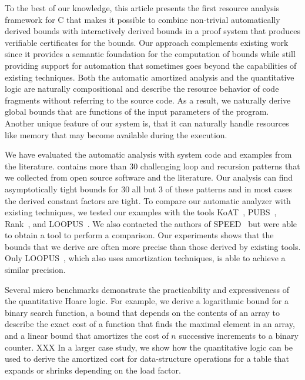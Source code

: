 \documentclass[nocopyrightspace,preprint]{sigplanconf}
\newcommand{\pref}[1]{\prettyref{#1}}
\begin{document}
To the best of our knowledge, this article presents the first resource
analysis framework for C that makes it possible to combine non-trivial
automatically derived bounds with interactively derived bounds in a
proof system that produces verifiable certificates for the bounds.
Our approach complements existing work since it provides a semantic
foundation for the computation of bounds while still providing support
for automation that sometimes goes beyond the capabilities of existing
techniques.  Both the automatic amortized analysis and the
quantitative logic are naturally compositional and describe the
resource behavior of code fragments without referring to the source
code.  As a result, we naturally derive global bounds that are
functions of the input parameters of the program.  Another unique
feature of our system is, that it can naturally handle resources like
memory that may become available during the execution.

We have evaluated the automatic analysis with system code and examples
from the literature.  \pref{app:cat} contains more than $30$
challenging loop and recursion patterns that we collected from open
source software and the literature.  Our analysis can find
asymptotically tight bounds for $30$ all but 3 of these patterns and
in most cases the derived constant factors are tight.  To compare our
automatic analyzer with existing techniques, we tested our examples
with the tools KoAT~\cite{BrockschmidtEFFG14},
PUBS~\cite{AlbertAGPZ12}, Rank~\cite{AliasDFG10}, and
LOOPUS~\cite{SinnZV14}.  We also contacted the authors of
SPEED~\cite{GulwaniMC09} but were able to obtain a tool to perform a
comparison.  Our experiments shows that the bounds that we derive are
often more precise than those derived by existing tools.  Only
LOOPUS~\cite{SinnZV14}, which also uses amortization techniques, is
able to achieve a similar precision.

Several micro benchmarks demonstrate the practicability and
expressiveness of the quantitative Hoare logic.  For example, we
derive a logarithmic bound for a binary search function, a bound that
depends on the contents of an array to describe the exact cost of a
function that finds the maximal element in an array, and a linear
bound that amortizes the cost of $n$ successive increments to a binary
counter.  XXX In a larger case study, we show how the quantitative
logic can be used to derive the amortized cost for data-structure
operations for a table that expands or shrinks depending on the load
factor.

\end{document}

